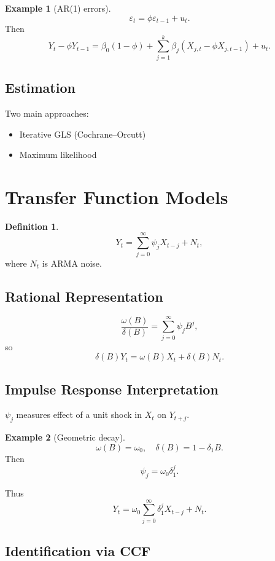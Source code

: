 \documentclass[12pt,oneside]{book}
\numberwithin{equation}{section}
\theoremstyle{definition}
\newtheorem{definition}{Definition}[section]
\newtheorem{example}{Example}[section]
\theoremstyle{plain}
\theoremstyle{remark}
\begin{document}
\begin{example}[AR(1) errors]
\[
\varepsilon_t = \phi \varepsilon_{t-1} + u_t.
\]
Then
\[
Y_t - \phi Y_{t-1}
=
\beta_0(1-\phi)
+
\sum_{j=1}^k \beta_j (X_{j,t} - \phi X_{j,t-1})
+
u_t.
\]
\end{example}

\subsection{Estimation}

Two main approaches:

\begin{itemize}
\item Iterative GLS (Cochrane–Orcutt)
\item Maximum likelihood
\end{itemize}

\section{Transfer Function Models}

\begin{definition}
\[
Y_t = \sum_{j=0}^\infty \psi_j X_{t-j} + N_t,
\]
where $N_t$ is ARMA noise.
\end{definition}

\subsection{Rational Representation}

\[
\frac{\omega(B)}{\delta(B)} = \sum_{j=0}^\infty \psi_j B^j,
\]
so
\[
\delta(B)Y_t = \omega(B)X_t + \delta(B)N_t.
\]

\subsection{Impulse Response Interpretation}

$\psi_j$ measures effect of a unit shock in $X_t$ on $Y_{t+j}$.

\begin{example}[Geometric decay]
\[
\omega(B)=\omega_0,\quad \delta(B)=1-\delta_1 B.
\]
Then
\[
\psi_j = \omega_0 \delta_1^j.
\]

Thus
\[
Y_t = \omega_0 \sum_{j=0}^\infty \delta_1^j X_{t-j} + N_t.
\]
\end{example}

\subsection{Identification via CCF}
\end{document}
